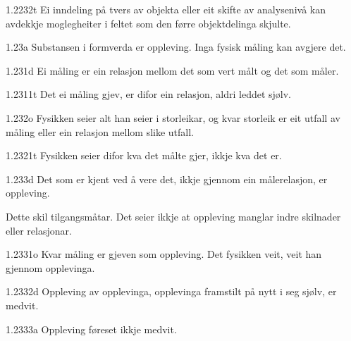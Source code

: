 \begin{formproposition}{1.2232}{t}
Ei inndeling på tvers av objekta eller eit skifte av analysenivå kan avdekkje moglegheiter i feltet som den førre objektdelinga skjulte.
\end{formproposition}

\begin{formproposition}{1.23}{a}
Substansen i formverda er oppleving. Inga fysisk måling kan avgjere det.
\end{formproposition}

\begin{formproposition}{1.231}{d}
Ei måling er ein relasjon mellom det som vert målt og det som måler.
\end{formproposition}

\begin{formproposition}{1.2311}{t}
Det ei måling gjev, er difor ein relasjon, aldri leddet sjølv.
\end{formproposition}

\begin{formproposition}{1.232}{o}
Fysikken seier alt han seier i storleikar, og kvar storleik er eit utfall av måling eller ein relasjon mellom slike utfall.
\end{formproposition}

\begin{formproposition}{1.2321}{t}
Fysikken seier difor kva det målte gjer, ikkje kva det er.
\end{formproposition}

\begin{formproposition}{1.233}{d}
Det som er kjent ved å vere det, ikkje gjennom ein målerelasjon, er oppleving.

Dette skil tilgangsmåtar. Det seier ikkje at oppleving manglar indre skilnader eller relasjonar.
\end{formproposition}

\begin{formproposition}{1.2331}{o}
Kvar måling er gjeven som oppleving. Det fysikken veit, veit han gjennom opplevinga.
\end{formproposition}

\begin{formproposition}{1.2332}{d}
Oppleving av opplevinga, opplevinga framstilt på nytt i seg sjølv, er medvit.
\end{formproposition}

\begin{formproposition}{1.2333}{a}
Oppleving føreset ikkje medvit.
\end{formproposition}

